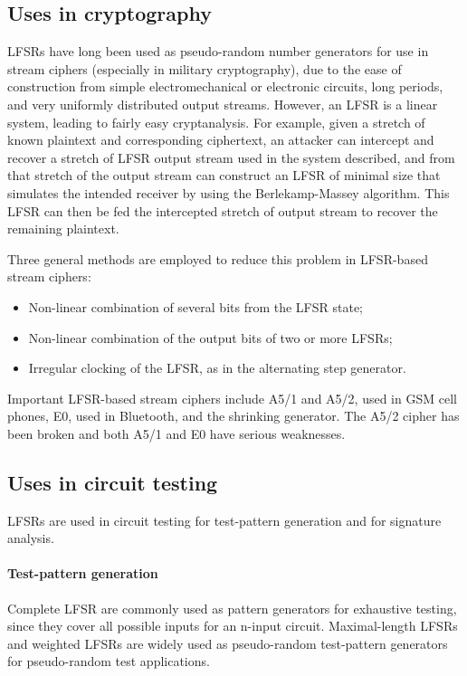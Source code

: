 \documentclass[11pt,a4paper,oneside, openright]{article}
\begin{document}
\subsection{Uses in cryptography}
LFSRs have long been used as pseudo-random number generators for use in stream ciphers (especially in military cryptography), due to the ease of construction from simple electromechanical or electronic circuits, long periods, and very uniformly distributed output streams. However, an LFSR is a linear system, leading to fairly easy cryptanalysis. For example, given a stretch of known plaintext and corresponding ciphertext, an attacker can intercept and recover a stretch of LFSR output stream used in the system described, and from that stretch of the output stream can construct an LFSR of minimal size that simulates the intended receiver by using the Berlekamp-Massey algorithm. This LFSR can then be fed the intercepted stretch of output stream to recover the remaining plaintext.

Three general methods are employed to reduce this problem in LFSR-based stream ciphers:
\begin{itemize}
    \item Non-linear combination of several bits from the LFSR state;
    \item Non-linear combination of the output bits of two or more LFSRs;
    \item Irregular clocking of the LFSR, as in the alternating step generator.
\end{itemize}

Important LFSR-based stream ciphers include A5/1 and A5/2, used in GSM cell phones, E0, used in Bluetooth, and the shrinking generator. The A5/2 cipher has been broken and both A5/1 and E0 have serious weaknesses.

\subsection{Uses in circuit testing}
LFSRs are used in circuit testing for test-pattern generation and for signature analysis.

\paragraph{Test-pattern generation}
Complete LFSR are commonly used as pattern generators for exhaustive testing, since they cover all possible inputs for an n-input circuit. Maximal-length LFSRs and weighted LFSRs are widely used as pseudo-random test-pattern generators for pseudo-random test applications.
\end{document}
